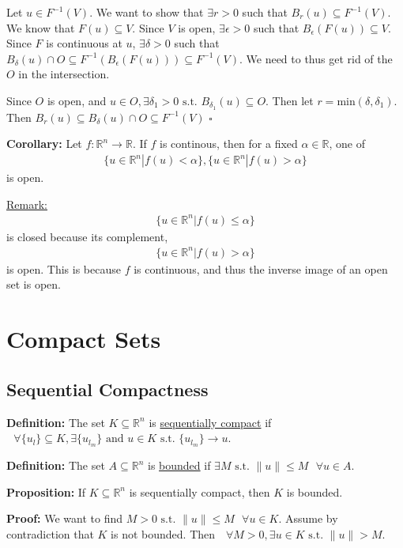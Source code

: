 \documentclass{article}
\newcommand*{\qed}{\hfill$\square$}%
\newcommand*{\txt}[1]{\text{ #1 }}%
\newcommand*{\fora}{\txt{}\forall}%
\newcommand*{\rr}{\mathbb{R}}%
\begin{document}
Let $u\in F^{-1}(V)$. We want to show that $\exists r>0$ such that $B_r(u)\subseteq F^{-1}(V)$. We know that $F(u)\subseteq V$. Since $V$ is open, $\exists \epsilon>0$ such that $B_\epsilon(F(u))\subseteq V$. Since $F$ is continuous at $u$, $\exists \delta>0$ such that $B_\delta(u)\cap O\subseteq F^{-1}(B_\epsilon(F(u)))\subseteq F^{-1}(V)$. We need to thus get rid of the $O$ in the intersection.

Since $O$ is open, and $u\in O, \exists \delta_1>0\txt{s.t.}B_{\delta_1}(u)\subseteq O$. Then let $r=\text{min}(\delta,\delta_1)$. Then $B_r(u)\subseteq B_\delta(u)\cap O\subseteq F^{-1}(V)$ \qed

\textbf{Corollary:} Let $f:\rr^n\to \rr$. If $f$ is continous, then for a fixed $\alpha\in \rr$, one of \begin{align*}
    \{u\in \rr^n | f(u)<\alpha\},\{u\in \rr^n|f(u)>\alpha\}
\end{align*}
is open.

\underline{Remark:}\begin{align*}
    \{u\in \rr^n | f(u)\leq \alpha\}
\end{align*} is closed because its complement, \begin{align*}
    \{u\in \rr^n | f(u)>\alpha\}
\end{align*} is open. This is because $f$ is continuous, and thus the inverse image of an open set is open.

\section{Compact Sets}

\subsection{Sequential Compactness}

\textbf{Definition:} The set $K\subseteq \rr^n$ is \underline{sequentially compact} if $\fora \{u_\mathit{l}\}\subseteq K, \exists \{u_{\mathit{l}_m}\}\txt{and}u\in K\txt{s.t.}\{u_{\mathit{l}_m}\}\to u$.

\textbf{Definition:} The set $A\subseteq \rr^n$ is \underline{bounded} if $\exists M\txt{s.t.}\|u\|\leq M\fora u\in A$.

\textbf{Proposition:} If $K\subseteq \rr^n$ is sequentially compact, then $K$ is bounded.

\textbf{Proof:} We want to find $M>0\txt{s.t.} \|u\|\leq M \fora u\in K$. Assume by contradiction that $K$ is not bounded. Then $\fora M>0, \exists u\in K\txt{s.t.}\|u\|>M$. 
\end{document}
